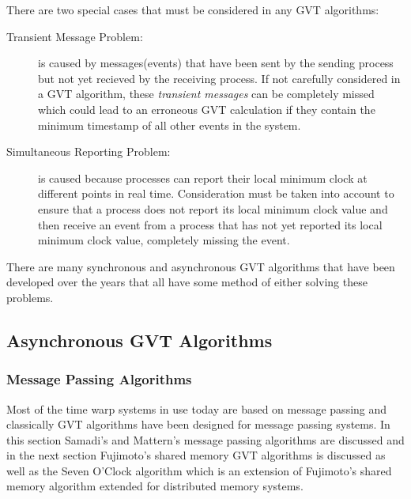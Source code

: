 \documentclass[11pt]{book}
\begin{document}
There are two special cases that must be considered in any GVT algorithms:

\begin{description}
    \item[Transient Message Problem:] is caused by messages(events) that have been sent by
    the sending process but not yet recieved by the receiving process. If not carefully
    considered in a GVT algorithm, these \emph{transient messages} can be completely missed
    which could lead to an erroneous GVT calculation if they contain the minimum timestamp
    of all other events in the system.
    \item[Simultaneous Reporting Problem:] is caused because processes can report their local
    minimum clock at different points in real time. Consideration must be taken into account
    to ensure that a process does not report its local minimum clock value and then receive
    an event from a process that has not yet reported its local minimum clock value,
    completely missing the event.
\end{description}

\noindent
There are many synchronous and asynchronous GVT algorithms that have been developed over the
years that all have some method of either solving these problems.

\subsection{Asynchronous GVT Algorithms}

\subsubsection{Message Passing Algorithms}

Most of the time warp systems in use today are based on message passing and classically
GVT algorithms have been designed for message passing systems. In this section Samadi's and
Mattern's message passing algorithms are discussed and in the next section Fujimoto's shared
memory GVT algorithms is discussed as well as the Seven O'Clock algorithm which is an
extension of Fujimoto's shared memory algorithm extended for distributed memory systems.
\end{document}
